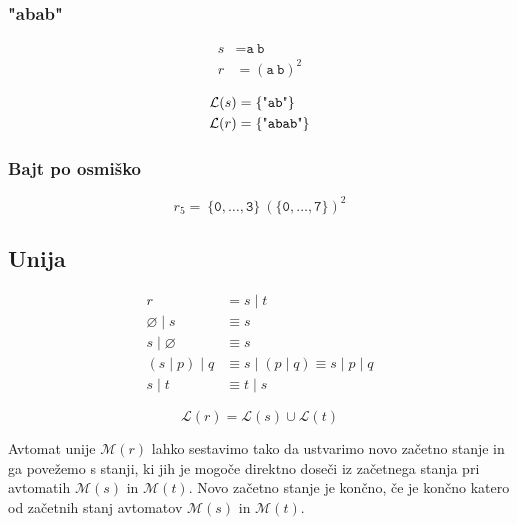 \documentclass{article}
\newcommand{\Empty}{\varnothing}
\newcommand{\Language}[1]{\mathcal{L}(#1)}
\newcommand{\Automaton}[1]{\mathcal{M}(#1)}
\newcommand{\Str}[1]{\text{\textquotedbl\texttt{#1}\textquotedbl}}
\newcommand{\Char}[1]{\texttt{#1}}
\newcommand{\Seq}{\ }
\newcommand{\Union}{\mathrel{|}}
\begin{document}
\subsubsection{"abab"}

\begin{align*}
  s &= \Char{a} \Seq \Char{b} \\
  r &= (\Char{a} \Seq \Char{b})^2
\end{align*}

\begin{align*}
  \Language{s} &= \{\Str{ab}\} \\
  \Language{r} &= \{\Str{abab}\} \\
\end{align*}

\subsubsection{Bajt po osmiško}
\begin{equation*}
  r_5 = \Seq \{\Char{0}, \dots, \Char{3}\} \Seq (\{\Char{0}, \dots, \Char{7}\})^2
\end{equation*}

\subsection{Unija}
\begin{align*}
  r &= s \Union t \\
  \Empty \Union s &\equiv s \\
  s \Union \Empty &\equiv s \\
  (s \Union p) \Union q &\equiv s \Union (p \Union q) \equiv s \Union p \Union q \\
  s \Union t &\equiv t \Union s
\end{align*}

\begin{equation*}
  \Language{r} = \Language{s} \cup \Language{t}
\end{equation*}

Avtomat unije $\Automaton{r}$ lahko sestavimo tako da ustvarimo novo začetno stanje in ga povežemo s stanji, ki jih je mogoče direktno doseči iz začetnega stanja pri avtomatih $\Automaton{s}$ in $\Automaton{t}$.
Novo začetno stanje je končno, če je končno katero od začetnih stanj avtomatov $\Automaton{s}$ in $\Automaton{t}$.
\end{document}
